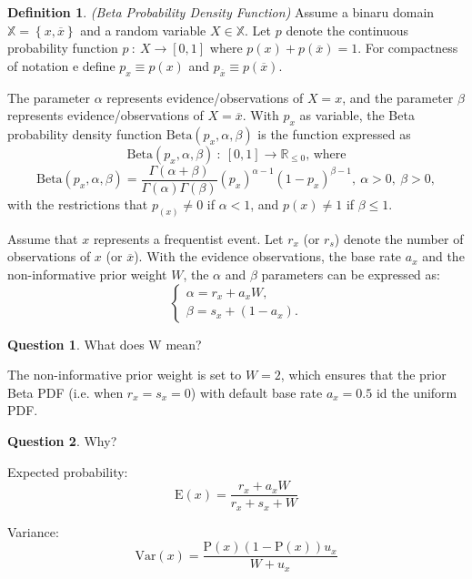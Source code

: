 \documentclass[a4paper,12pt]{article}
\theoremstyle{definition}
\newtheorem{question}{Question}[section]
\newtheorem{definition}{Definition}[section]
\numberwithin{equation}{section}
\begin{document}
\begin{definition}
	\emph{(Beta Probability Density Function)} Assume a binaru domain $\mathbb{X} = \left\{x,\overline{x}\right\}$ and a random variable $X \in \mathbb{X}$. Let $p$ denote the continuous probability function $p\ :\ X \rightarrow \left[0,1\right]$ where $p(x) + p(\overline{x}) = 1$. For compactness of notation e define $p_x \equiv p\left(x\right)$ and $p_{\overline{x}} \equiv p\left(\overline{x}\right)$.
	
	The parameter $\alpha$ represents evidence/observations of $X = x$, and the parameter $\beta$ represents evidence/observations of $X = \overline{x}$. With $p_x$ as variable, the Beta probability density function $\mathrm{Beta}(p_x, \alpha, \beta)$ is the function expressed as
	\begin{equation}
		\mathrm{Beta}(p_x, \alpha, \beta)\ :\ [0, 1] \rightarrow \mathbb{R}_{\leq0}\text{, where}
	\end{equation}
	\begin{equation}
		\mathrm{Beta}(p_x, \alpha, \beta) = \dfrac{\Gamma(\alpha + \beta)}{\Gamma(\alpha)\Gamma(\beta)}(p_x)^{\alpha - 1}(1 - p_x)^{\beta - 1},\ \alpha > 0,\ \beta > 0,
	\end{equation}
	with the restrictions that $p_(x) \neq 0$ if $\alpha < 1$, and $p(x) \neq 1$ if $\beta \leq 1$.
\end{definition}

Assume that $x$ represents a frequentist event. Let $r_x$ (or $r_s$) denote the number of observations of $x$ (or $\overline{x}$). With the evidence observations, the base rate $a_x$ and the non-informative prior weight $W$, the $\alpha$ and $\beta$ parameters can be expressed as:
\begin{equation}
	\begin{cases}
		\alpha = r_x + a_x W\text{,} \\
		\beta = s_x + (1 - a_x)\text{.}
	\end{cases}
\end{equation}

\begin{question}
	What does W mean? 
\end{question}

The non-informative prior weight is set to $W = 2$, which ensures that the prior Beta PDF (i.e. when $r_x = s_x = 0$) with default base rate $a_x = 0.5$ id the uniform PDF.

\begin{question}
	Why?
\end{question} 

Expected probability:
\begin{equation}
	\mathrm{E}(x) = \frac{r_x + a_x W}{r_x + s_x + W}
\end{equation}

Variance:
\begin{equation}
	\mathrm{Var}(x) = \frac{\mathrm{P}(x)(1 - \mathrm{P}(x))u_x}{W + u_x}
\end{equation}
\end{document}
